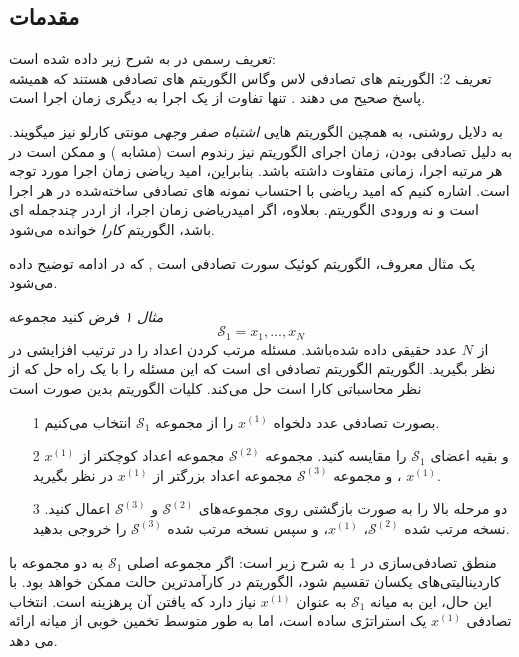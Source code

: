 \documentclass[12pt]{article} %
\begin{document}
   	\subsection{مقدمات}
	تعریف رسمی در \cite{bib17} به شرح زیر داده شده است:\\
	تعریف 2: الگوریتم های تصادفی لاس وگاس
	الگوریتم های تصادفی هستند که همیشه پاسخ صحیح می دهند
	. تنها تفاوت از یک اجرا به دیگری زمان اجرا است.
	\par
	به دلایل روشنی، به همچین الگوریتم هایی 
	\emph{اشتباه صفر وجهی}
	مونتی کارلو نیز میگویند. به دلیل تصادفی بودن، زمان اجرای الگوریتم نیز رندوم است (مشابه ) و ممکن است در هر مرتبه اجرا، زمانی متفاوت داشته باشد. بنابراین، امید ریاضی زمان اجرا مورد توجه است. اشاره کنیم که امید ریاضی با احتساب نمونه های تصادفی ساخته‌شده در هر اجرا است و نه ورودی الگوریتم. بعلاوه، اگر امیدریاضی زمان اجرا، از اردر چندجمله ای باشد، الگوریتم 
	\emph{کارا}
	خوانده می‌شود.
	\par
	یک مثال معروف، الگوریتم کوئیک سورت تصادفی  است 
	\cite{bib14}, \cite{bib17}
	که در ادامه توضیح داده می‌شود.
	\par
	\textit{مثال ۱} 
	فرض کنید مجموعه 
	\begin{equation*}
		\mathscr{S}_1 = {x_1 , . . . , x_N } 
	\end{equation*}
	از
	$N$
	عدد حقیقی داده شده‌باشد. مسئله مرتب کردن اعداد را در ترتیب افزایشی در نظر بگیرید. الگوریتم  الگوریتم تصادفی ای است که این مسئله را با یک راه حل که از نظر محاسباتی کارا است حل می‌کند. کلیات الگوریتم بدین صورت است
	\begin{itemize}
		\item[1]
		بصورت تصادفی عدد دلخواه
		$x^{(1)}$
		را از مجموعه
		$\mathscr{S}_1$
		انتخاب می‌کنیم.
		\item[2]
		$x^{(1)}$
		و بقیه اعضای
		$\mathscr{S}_1$
		را مقایسه کنید. مجموعه
		$\mathscr{S}^{(2)}$
		مجموعه اعداد کوچکتر از 
		$x^{(1)}$
		، و مجموعه 
		$\mathscr{S}^{(3)}$
		مجموعه اعداد بزرگتر از
		$x^{(1)}$
		در نظر بگیرید.
		\item[3]
		دو مرحله بالا را به صورت بازگشتی روی مجموعه‌های $\mathscr{S}^{(2)}$ و $\mathscr{S}^{(3)}$ اعمال کنید. نسخه مرتب شده $\mathscr{S}^{(2)}$، $x^{(1)}$، و سپس نسخه مرتب شده $\mathscr{S}^{(3)}$ را خروجی بدهید.
	\end{itemize}
	\par
	منطق تصادفی‌سازی در 1 به شرح زیر است: اگر مجموعه اصلی $\mathscr{S}_1$ به دو مجموعه با کاردینالیتی‌های یکسان تقسیم شود، الگوریتم در کارآمدترین حالت ممکن خواهد بود. با این حال، این به میانه $\mathscr{S}_1$ به عنوان $x^{(1)}$ نیاز دارد که یافتن آن پرهزینه است. انتخاب تصادفی $x^{(1)}$ یک استراتژی ساده است، اما به طور متوسط تخمین خوبی از میانه ارائه می دهد.
\end{document}
